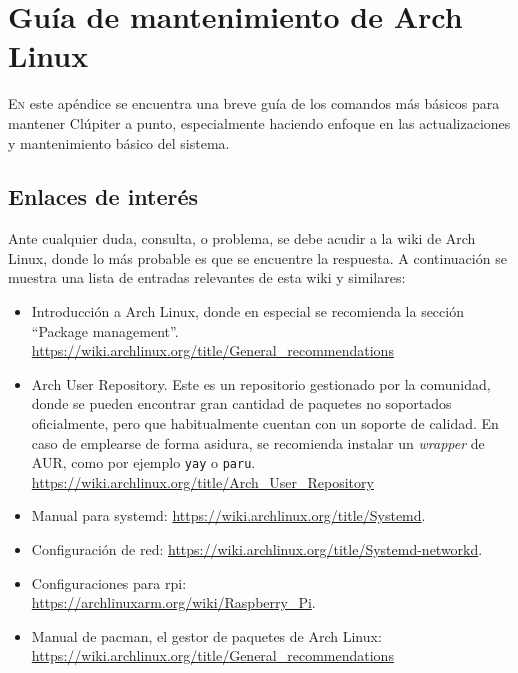 \chapter{Guía de mantenimiento de Arch Linux}
\label{chap:archlinux_maintenance_guide}

\lettrine{E}{n} este apéndice se encuentra una breve guía de los comandos más básicos para mantener Clúpiter a punto, especialmente haciendo enfoque en las actualizaciones y mantenimiento básico del sistema.

\section{Enlaces de interés}
Ante cualquier duda, consulta, o problema, se debe acudir a la wiki de Arch Linux, donde lo más probable es que se encuentre la respuesta. A continuación se muestra una lista de entradas relevantes de esta wiki y similares:

\begin{itemize}
    \item Introducción a Arch Linux, donde en especial se recomienda la sección ``Package management''.
    \url{https://wiki.archlinux.org/title/General_recommendations}

    \item Arch User Repository. Este es un repositorio gestionado por la comunidad, donde se pueden encontrar gran cantidad de paquetes no soportados oficialmente, pero que habitualmente cuentan con un soporte de calidad. En caso de emplearse de forma asidura, se recomienda instalar un \textit{wrapper} de AUR, como por ejemplo \texttt{yay} o \texttt{paru}.\\
    \url{https://wiki.archlinux.org/title/Arch_User_Repository}

    \item Manual para systemd: \url{https://wiki.archlinux.org/title/Systemd}.
    \item Configuración de red: \url{https://wiki.archlinux.org/title/Systemd-networkd}.
    \item Configuraciones para \acrlong{rpi}: \\\url{https://archlinuxarm.org/wiki/Raspberry_Pi}.

    \item Manual de pacman, el gestor de paquetes de Arch Linux: \\\url{https://wiki.archlinux.org/title/General_recommendations}
\end{itemize}

